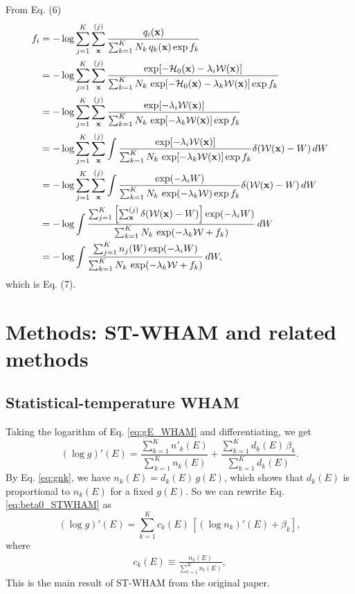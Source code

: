 \documentclass[aip,jcp,preprint,notitlepage, superscriptaddress]{revtex4-1}
\begin{document}
From Eq. (6)
\begin{align*}
f_i
&=
-\log
\sum_{j = 1}^K
\sum_{\bm{\mathrm{x}}}^{(j)}
\frac{
  q_i(\bm{\mathrm{x}})
}
{
  \sum_{k = 1}^K N_k \, q_k(\bm{\mathrm{x}}) \exp f_k
}
\\
&=
-\log
\sum_{j = 1}^K
\sum_{\bm{\mathrm{x}}}^{(j)}
\frac{
  \exp[-\mathcal{H}_0(\bm{\mathrm{x}}) - \lambda_i \mathcal{W}(\bm{\mathrm{x}})]
}
{
  \sum_{k = 1}^K N_k \,
  \exp[-\mathcal{H}_0(\bm{\mathrm{x}}) - \lambda_k \mathcal{W}(\bm{\mathrm{x}})]
  \exp f_k
}
\\
&=
-\log
\sum_{j = 1}^K
\sum_{\bm{\mathrm{x}}}^{(j)}
\frac{
  \exp[- \lambda_i \mathcal{W}(\bm{\mathrm{x}})]
}
{
  \sum_{k = 1}^K N_k \,
  \exp[ - \lambda_k \mathcal{W}(\bm{\mathrm{x}})]
  \exp f_k
}
\\
&=
-\log
\sum_{j = 1}^K
\sum_{\bm{\mathrm{x}}}^{(j)}
\int
\frac{
  \exp[- \lambda_i \mathcal{W}(\bm{\mathrm{x}})]
}
{
  \sum_{k = 1}^K N_k \,
  \exp[ - \lambda_k \mathcal{W}(\bm{\mathrm{x}})]
  \exp f_k
}
\delta(\mathcal{W}(\bm{\mathrm{x}}) - W) \, dW
\\
&=
-\log
\sum_{j = 1}^K
\sum_{\bm{\mathrm{x}}}^{(j)}
\int
\frac{
  \exp(- \lambda_i W)
}
{
  \sum_{k = 1}^K N_k \,
  \exp( - \lambda_k \mathcal{W})
  \exp f_k
}
\delta(\mathcal{W}(\bm{\mathrm{x}}) - W)
\, dW
\\
&=
-\log
\int
\frac{
  \sum_{j = 1}^K
  \left[
    \sum_{\bm{\mathrm{x}}}^{(j)}
    \delta(\mathcal{W}(\bm{\mathrm{x}}) - W)
  \right]
  \exp(- \lambda_i W)
}
{
  \sum_{k = 1}^K N_k \,
  \exp( - \lambda_k \mathcal{W} + f_k )
}
\, dW
\\
&=
-\log
\int
\frac{
  \sum_{j = 1}^K
  n_j(W)
  \exp(- \lambda_i W)
}
{
  \sum_{k = 1}^K N_k \,
  \exp( - \lambda_k \mathcal{W} + f_k )
}
\, dW,
\end{align*}
which is Eq. (7).




\section{Methods: ST-WHAM and related methods}



\subsection{Statistical-temperature WHAM}



Taking the logarithm of Eq. \eqref{eq:gE_WHAM} and differentiating,
we get
\begin{equation}
(\log g)'(E)
=
\frac{ \sum_{k = 1}^K n'_k(E) }
     { \sum_{k = 1}^K n_k(E) }
+
\frac{ \sum_{k = 1}^K d_k(E) \, \beta_k }
     { \sum_{k = 1}^K d_k(E) }.
\label{eq:beta0_STWHAM}
\end{equation}
%
By Eq. \eqref{eq:gnk},
we have
$n_k(E) = d_k(E) \, g(E)$,
which shows that
$d_k(E)$
is proportional to $n_k(E)$
for a fixed $g(E)$.
%
So we can rewrite Eq. \eqref{eq:beta0_STWHAM} as
%
\begin{equation}
(\log g)'(E)
=
\sum_{k = 1}^K c_k(E) \, \left[ (\log n_k)'(E)  + \beta_k \right],
\label{eq:beta_STWHAM}
\end{equation}
%
where
\begin{align}
  c_k(E) \equiv \frac{ n_k(E)  }{ \sum_{l = 1}^{K} n_l(E) },
  \label{eq:ck}
\end{align}
%
This is the main result of ST-WHAM
from the original paper\cite{
kim2011}.
\end{document}
